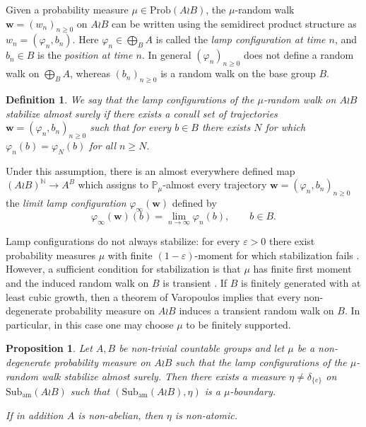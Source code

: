 \documentclass[reqno,a4paper,11pt]{amsart}
\numberwithin{equation}{section}
\newcommand{\1}{\mathbf{1}}
\newtheorem{defn}[teo]{Definition}
\newtheorem{prop}[teo]{Proposition}
\theoremstyle{definition}
\begin{document}
	Given a probability measure $\mu \in \mathrm{Prob}(A \wr B)$, the $\mu$-random walk $\mathbf{w}=(w_n)_{n\ge0}$ on $A \wr B$ can be written using the semidirect product structure as \(w_n=(\varphi_n,b_n).\) Here $\varphi_n\in \bigoplus_B A$ is called the \emph{lamp configuration at
		time $n$}, and $b_n\in B$ is the \emph{position at time $n$}. In general $(\varphi_n)_{n\ge 0}$ does not define a random walk on $\bigoplus_B A$, whereas $(b_n)_{n\ge 0}$ is a random walk on the base group $B$.
	
	\begin{defn}
		We say that the lamp configurations of the $\mu$-random walk on $A\wr B$ \emph{stabilize almost surely} if there exists a conull set of trajectories $\mathbf{w}=(\varphi_n,b_n)_{n\ge0}$ such that for every
		$b\in B$ there exists $N$ for which \( \varphi_n(b)=\varphi_N(b)\) for all \( n\ge N .\)
	\end{defn}
	
	Under this assumption, there is an almost everywhere defined map \( (A\wr B)^{\mathbb N} \to A^B \)
	which assigns to $\mathbb P_\mu$-almost every trajectory $\mathbf w=(\varphi_n,b_n)_{n\ge0}$ the \emph{limit lamp configuration} $\varphi_\infty(\mathbf w)$ defined by
	\[
	\varphi_\infty(\mathbf w)(b)=\lim_{n\to\infty}\varphi_n(b), \qquad b\in B.
	\]
	
	Lamp configurations do not always stabilize: for every $\varepsilon>0$
	there exist probability measures $\mu$ with finite $(1-\varepsilon)$-moment
	for which stabilization fails \cite{Kaimanovich1983}. However, a sufficient
	condition for stabilization is that $\mu$ has finite first moment and the
	induced random walk on $B$ is transient \cite{Erschler2011}. If $B$ is
	finitely generated with at least cubic growth, then a theorem of
	Varopoulos \cite{Varopoulos1986} implies that every non-degenerate
	probability measure on $A\wr B$ induces a transient random walk on $B$.
	In particular, in this case one may choose $\mu$ to be finitely supported.
	
	\begin{prop}\label{prop: wreath products}
		Let $A,B$ be non-trivial countable groups and let $\mu$ be a non-degenerate
		probability measure on $A\wr B$ such that the lamp configurations of the
		$\mu$-random walk stabilize almost surely. Then there exists a measure
		$\eta \neq \delta_{\{e\}}$ on $\mathrm{Sub}_{\mathrm{am}}(A\wr B)$ such that
		$(\mathrm{Sub}_{\mathrm{am}}(A\wr B),\eta)$ is a $\mu$-boundary.
		
		If in addition $A$ is non-abelian, then $\eta$ is non-atomic.
	\end{prop}
	
\end{document}
